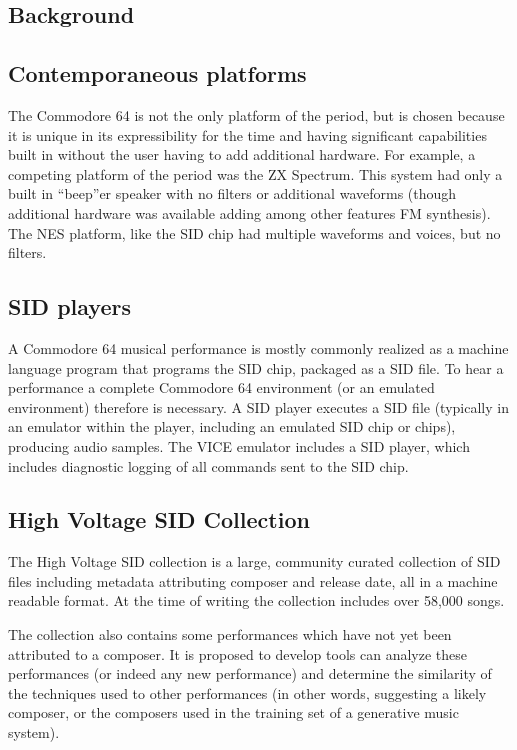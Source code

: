 \documentclass[10pt]{article}
\begin{document}
\begin{multicols*}{2}
  \section{Background}

  \subsection{Contemporaneous platforms}
  The Commodore 64 is not the only platform of the period, but is
  chosen because it is unique in its expressibility for the time and
  having significant capabilities built in without the user having to
  add additional hardware. For example, a competing platform of the
  period was the ZX Spectrum. This system had only a built in
  ``beep''er speaker with no filters or additional waveforms (though
  additional hardware was available adding among other features
  FM synthesis). The NES platform, like the SID chip had multiple
  waveforms and voices, but no filters.

  \subsection{SID players}
  A Commodore 64 musical performance is mostly commonly realized as a
  machine language program that programs the SID chip, packaged as a
  SID file. To hear a performance a complete Commodore 64 environment
  (or an emulated environment) therefore is necessary. A SID player
  executes a SID file (typically in an emulator within the player,
  including an emulated SID chip or chips), producing audio samples.
  The VICE emulator includes a SID player, which includes diagnostic
  logging of all commands sent to the SID chip.

  \subsection{High Voltage SID Collection}
  The High Voltage SID collection is a large, community curated
  collection of SID files including metadata attributing composer
  and release date, all in a machine readable format. At the time
  of writing the collection includes over 58,000 songs.

  The collection also contains some performances which have not
  yet been attributed to a composer. It is proposed to develop tools
  can analyze these performances (or indeed any new performance) and
  determine the similarity of the techniques used to other
  performances (in other words, suggesting a likely composer, or the
  composers used in the training set of a generative music system).


\end{multicols*}
\end{document}
